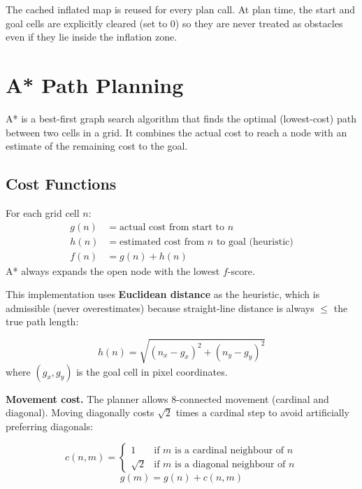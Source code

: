 \documentclass[12pt,a4paper]{article}
\begin{document}
The cached inflated map is reused for every plan call. At plan time, the start
and goal cells are explicitly cleared (set to 0) so they are never treated as
obstacles even if they lie inside the inflation zone.

\section{A* Path Planning}

A* is a best-first graph search algorithm that finds the optimal
(lowest-cost) path between two cells in a grid. It combines the actual cost
to reach a node with an estimate of the remaining cost to the goal.

\subsection{Cost Functions}

\begin{tcolorbox}[definitionbox, title={A* Scores}]
For each grid cell $n$:
\begin{align}
  g(n) &= \text{actual cost from start to } n \label{eq:g}\\
  h(n) &= \text{estimated cost from } n \text{ to goal (heuristic)} \label{eq:h}\\
  f(n) &= g(n) + h(n) \label{eq:f}
\end{align}
A* always expands the open node with the lowest $f$-score.
\end{tcolorbox}

This implementation uses \textbf{Euclidean distance} as the heuristic,
which is admissible (never overestimates) because straight-line distance
is always $\leq$ the true path length:

\begin{tcolorbox}[formulabox, title={Heuristic}]
\[
  h(n) = \sqrt{(n_x - g_x)^2 + (n_y - g_y)^2}
\]
where $(g_x, g_y)$ is the goal cell in pixel coordinates.
\end{tcolorbox}

\textbf{Movement cost.}
The planner allows 8-connected movement (cardinal and diagonal).
Moving diagonally costs $\sqrt{2}$ times a cardinal step to avoid
artificially preferring diagonals:

\begin{tcolorbox}[formulabox, title={Step Cost}]
\[
  c(n, m) =
  \begin{cases}
    1 & \text{if } m \text{ is a cardinal neighbour of } n \\
    \sqrt{2} & \text{if } m \text{ is a diagonal neighbour of } n
  \end{cases}
\]
\[
  g(m) = g(n) + c(n, m)
\]
\end{tcolorbox}
\end{document}
